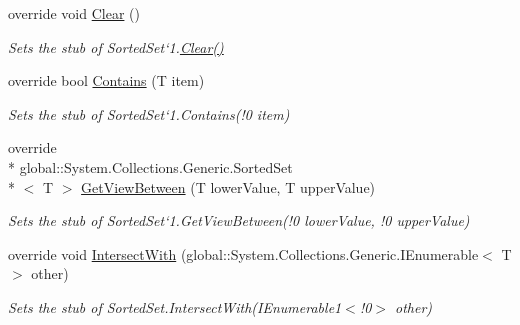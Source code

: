 \begin{DoxyCompactItemize}
override void \hyperlink{class_system_1_1_collections_1_1_generic_1_1_fakes_1_1_stub_sorted_set_3_01_t_01_4_a649b5664cbd33758bb866d58ad2696a9}{Clear} ()
\begin{DoxyCompactList}\small\item\em Sets the stub of Sorted\-Set`1.\hyperlink{class_system_1_1_collections_1_1_generic_1_1_fakes_1_1_stub_sorted_set_3_01_t_01_4_a649b5664cbd33758bb866d58ad2696a9}{Clear()}\end{DoxyCompactList}\item 
override bool \hyperlink{class_system_1_1_collections_1_1_generic_1_1_fakes_1_1_stub_sorted_set_3_01_t_01_4_a1c0230e52df4907c49552efc498be2ee}{Contains} (T item)
\begin{DoxyCompactList}\small\item\em Sets the stub of Sorted\-Set`1.Contains(!0 item)\end{DoxyCompactList}\item 
override \\*
global\-::\-System.\-Collections.\-Generic.\-Sorted\-Set\\*
$<$ T $>$ \hyperlink{class_system_1_1_collections_1_1_generic_1_1_fakes_1_1_stub_sorted_set_3_01_t_01_4_a1fc22dad52ce128d54e79182d1f18627}{Get\-View\-Between} (T lower\-Value, T upper\-Value)
\begin{DoxyCompactList}\small\item\em Sets the stub of Sorted\-Set`1.Get\-View\-Between(!0 lower\-Value, !0 upper\-Value)\end{DoxyCompactList}\item 
override void \hyperlink{class_system_1_1_collections_1_1_generic_1_1_fakes_1_1_stub_sorted_set_3_01_t_01_4_a7b5abcfcb20c2370f391b372d24574f6}{Intersect\-With} (global\-::\-System.\-Collections.\-Generic.\-I\-Enumerable$<$ T $>$ other)
\begin{DoxyCompactList}\small\item\em Sets the stub of Sorted\-Set{.\-Intersect\-With(I\-Enumerable}1$<$!0$>$ other)\end{DoxyCompactList}\end{DoxyCompactItemize}
